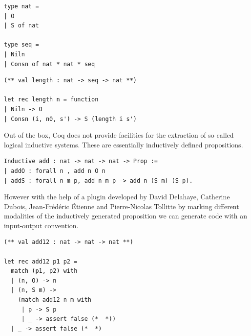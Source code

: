 \documentclass[12pt,twoside,notitlepage]{report}
\begin{document}
\begin{minipage}{\linewidth}
\begin{lstlisting}[caption={Coq to OCaml extraction of seq}]
type nat =
| O
| S of nat

type seq =
| Niln
| Consn of nat * nat * seq
\end{lstlisting}
\end{minipage}

\begin{minipage}{\linewidth}
\begin{lstlisting}[caption={Coq to OCaml extraction of length}]
(** val length : nat -> seq -> nat **)

let rec length n = function
| Niln -> O
| Consn (i, n0, s') -> S (length i s')
\end{lstlisting}
\end{minipage}


Out of the box, Coq does not provide facilities for the extraction of so called logical inductive systems. These are essentially inductively defined propositions.


\begin{minipage}{\linewidth}
\begin{lstlisting}[language={Coq},caption={Coq logical inductive example}]
Inductive add : nat -> nat -> nat -> Prop :=
| addO : forall n , add n O n
| addS : forall n m p, add n m p -> add n (S m) (S p).
\end{lstlisting}
\end{minipage}

However with the help of a plugin developed by David Delahaye, Catherine Dubois, Jean-Fr\'ed\'eric \'Etienne and Pierre-Nicolas Tollitte \cite{delahaye2007extracting,tollitte2012producing} by marking different modalities of the inductively generated proposition we can generate code with an input-output convention.



\begin{minipage}{\linewidth}
\begin{lstlisting}[language={Coq},caption={Coq to OCaml extraction of a logical inductive relation}]
(** val add12 : nat -> nat -> nat **)

let rec add12 p1 p2 =
  match (p1, p2) with
  | (n, O) -> n
  | (n, S m) ->
    (match add12 n m with
     | p -> S p
     | _ -> assert false (*  *))
  | _ -> assert false (*  *)
\end{lstlisting}
\end{minipage}
\end{document}
